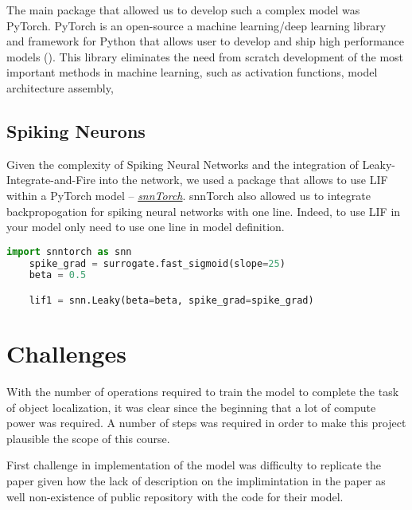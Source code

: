 The main package that allowed us to develop such a complex model was PyTorch. PyTorch
is an open-source a machine learning/deep learning library and framework for Python 
that allows user to develop and ship high performance models (). This library
eliminates the need from scratch development of the most important methods in machine learning,
such as activation functions, model architecture assembly, 


\subsection{Spiking Neurons}

Given the complexity of Spiking Neural Networks and the integration of Leaky-Integrate-and-Fire
into the network, we used a package that allows to use LIF within a PyTorch model -- 
\href{https://snntorch.readthedocs.io/en/latest/snntorch.html}{\textit{snnTorch}}. 
snnTorch also allowed us to integrate backpropogation for spiking neural networks
with one line. Indeed, to use LIF in your model only need to use one line in model
definition.

\begin{lstlisting}[language=Python, caption=Leaky-Integrate-and-Fire using snnTorch]
	import snntorch as snn
	spike_grad = surrogate.fast_sigmoid(slope=25)
	beta = 0.5

	lif1 = snn.Leaky(beta=beta, spike_grad=spike_grad)

\end{lstlisting}

\section{Challenges}

With the number of operations required to train the model to complete the task of object
localization, it was clear since the beginning that a lot of compute power was required. A number
of steps was required in order to make this project plausible the scope of this course.

First challenge in implementation of the model was difficulty to replicate the 
 paper given how the lack of description on the implimintation in the 
paper as well non-existence of public repository with the code for their model.
